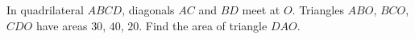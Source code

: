 In quadrilateral $ABCD$, diagonals $AC$ and $BD$ meet at $O$. Triangles $ABO$, $BCO$, $CDO$ have areas $30$, $40$, $20$. Find the area of triangle $DAO$.
